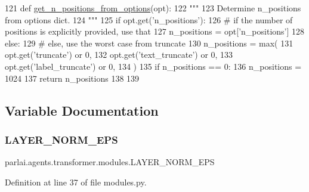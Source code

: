 \begin{DoxyCode}
121 \textcolor{keyword}{def }\hyperlink{namespaceparlai_1_1agents_1_1transformer_1_1modules_ab67607512c597ddd54f2b60a1a1eaf4c}{get\_n\_positions\_from\_options}(opt):
122     \textcolor{stringliteral}{"""}
123 \textcolor{stringliteral}{    Determine n\_positions from options dict.}
124 \textcolor{stringliteral}{    """}
125     \textcolor{keywordflow}{if} opt.get(\textcolor{stringliteral}{'n\_positions'}):
126         \textcolor{comment}{# if the number of positions is explicitly provided, use that}
127         n\_positions = opt[\textcolor{stringliteral}{'n\_positions'}]
128     \textcolor{keywordflow}{else}:
129         \textcolor{comment}{# else, use the worst case from truncate}
130         n\_positions = max(
131             opt.get(\textcolor{stringliteral}{'truncate'}) \textcolor{keywordflow}{or} 0,
132             opt.get(\textcolor{stringliteral}{'text\_truncate'}) \textcolor{keywordflow}{or} 0,
133             opt.get(\textcolor{stringliteral}{'label\_truncate'}) \textcolor{keywordflow}{or} 0,
134         )
135         \textcolor{keywordflow}{if} n\_positions == 0:
136             n\_positions = 1024
137     \textcolor{keywordflow}{return} n\_positions
138 
139 
\end{DoxyCode}


\subsection{Variable Documentation}
\mbox{\label{namespaceparlai_1_1agents_1_1transformer_1_1modules_a05d7fdb12d6d53f201ad11c3a487bd18}} 
\subsubsection{\texorpdfstring{L\+A\+Y\+E\+R\+\_\+\+N\+O\+R\+M\+\_\+\+E\+PS}{LAYER\_NORM\_EPS}}
{\footnotesize\ttfamily parlai.\+agents.\+transformer.\+modules.\+L\+A\+Y\+E\+R\+\_\+\+N\+O\+R\+M\+\_\+\+E\+PS}



Definition at line 37 of file modules.\+py.


